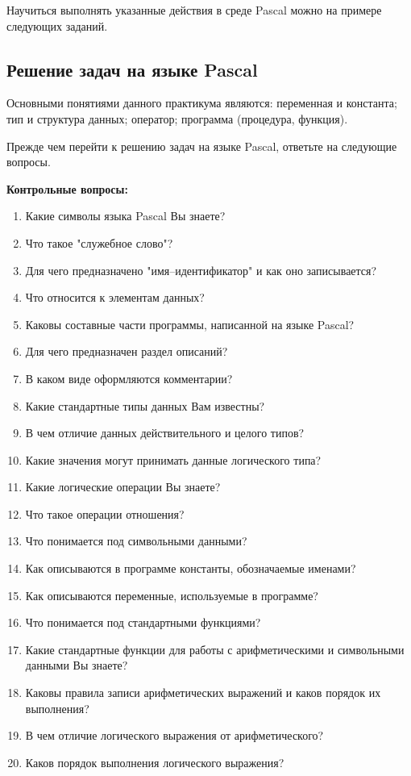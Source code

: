 Научиться выполнять указанные действия в среде Pascal можно на примере следующих заданий.

\subsection{Решение задач на языке Pascal}

Основными понятиями данного практикума являются: переменная и константа; тип и структура данных; оператор; программа (процедура, функция).

Прежде чем перейти к решению задач на языке Pascal, ответьте на следующие вопросы.

{\bf Контрольные вопросы:}
\begin{enumerate}
\item Какие символы языка Pascal Вы знаете?
\item Что такое "служебное слово"? 
\item Для чего предназначено "имя--идентификатор" и как оно записывается?
\item Что относится к элементам данных? 
\item Каковы составные части программы, написанной на языке Pascal?
\item Для чего предназначен раздел описаний?
\item В каком виде оформляются комментарии?
\item Какие стандартные типы данных Вам известны?
\item В чем отличие данных действительного и целого типов?
\item Какие значения могут принимать данные логического типа?
\item Какие логические операции Вы знаете?
\item Что такое операции отношения?
\item Что понимается под символьными данными?
\item Как описываются в программе константы, обозначаемые именами?
\item Как описываются переменные, используемые в программе?
\item Что понимается под стандартными функциями?
\item Какие стандартные функции для работы с арифметическими и символьными данными Вы знаете?
\item Каковы правила записи арифметических выражений и каков порядок их выполнения?
\item В чем отличие логического выражения от арифметического?
\item Каков порядок выполнения логического выражения?

\end{enumerate}
